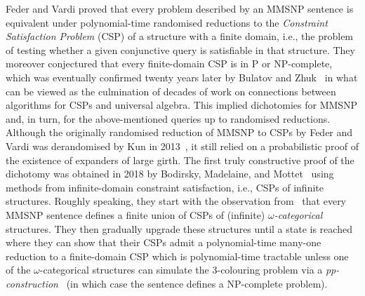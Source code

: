 \documentclass[oneside,reqno,12pt]{amsart}
\theoremstyle{plain}
\theoremstyle{remark}
\begin{document}
Feder and Vardi proved that every problem described by an MMSNP sentence is equivalent under polynomial-time randomised reductions to the \emph{Constraint Satisfaction Problem} (CSP) of a  structure with a finite domain, i.e., the problem of testing whether a given conjunctive query is satisfiable in that structure.
They moreover conjectured that every finite-domain CSP is in \textsf{P} or \textsf{NP}-complete, which was eventually confirmed twenty years later by Bulatov and Zhuk~\cite{bulatov2017,zhuk2020} in what can be viewed as the culmination of decades of work on connections between algorithms for CSPs and universal algebra.
This implied dichotomies for MMSNP and, in turn, for the above-mentioned queries up to randomised reductions. 
Although the originally randomised reduction of MMSNP to CSPs by Feder and Vardi was derandomised by Kun in 2013~\cite{kun2013}, it still relied on a probabilistic proof of the existence of expanders of large girth. The first truly constructive proof of the dichotomy was obtained in 2018 by Bodirsky, Madelaine, and Mottet~\cite{bodirsky2018_article} using methods from infinite-domain constraint satisfaction, i.e., CSPs of infinite structures.  
Roughly speaking, they start with the observation from~\cite{BodDalJournal} that every MMSNP sentence defines a finite union of CSPs of (infinite) \emph{$\omega$-categorical} structures. 
They then gradually upgrade these structures until a state is reached where they can show that their  CSPs admit a polynomial-time many-one reduction to a finite-domain CSP which is polynomial-time tractable unless one of the $\omega$-categorical structures can simulate the 3-colouring problem via  a \emph{pp-construction}~\cite{wonderland} (in which case the sentence defines a NP-complete problem).
\end{document}

